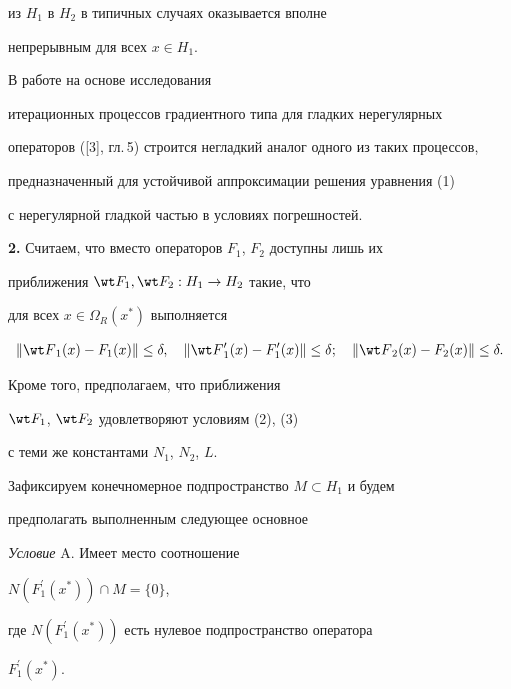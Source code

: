 из $H_1$ в $H_2$ в типичных случаях оказывается вполне


непрерывным для всех $x \in H_1$.


В работе на основе исследования


итерационных процессов градиентного типа для гладких нерегулярных


операторов ([3], гл.\,5) строится негладкий аналог одного из таких процессов,


предназначенный для устойчивой аппроксимации решения уравнения (1)


с нерегулярной гладкой частью в условиях погрешностей.


\medskip





{\bf 2.} Считаем, что вместо операторов $F_1$, $F_2$ доступны лишь их


приближения $\wt F_1, \wt F_2: H_1 \to H_2$ такие, что


для всех $x \in \Omega_R (x^*)$ выполняется


\begin{equation}


\Vert {\wt F}_1 (x)- F_1 (x) \Vert \leq \delta, \quad


\Vert {\wt F}{}_1^{\prime}(x)- F_1^{\prime}(x) \Vert \leq \delta;\quad


\Vert {\wt F}_2 (x)- F_2 (x) \Vert \leq \delta.


\end{equation}


Кроме того, предполагаем, что приближения


$\wt F_1$, $\wt F_2$ удовлетворяют условиям (2), (3)


с теми же константами $N_1$, $N_2$, $L$.





Зафиксируем конечномерное подпространство $M \subset H_1$ и будем


предполагать выполненным следующее основное


\medskip





{\it Условие} A. Имеет место соотношение


$N(F_1^{\prime}(x^*)) \cap M =\{ 0\}$,


где $N(F_1^{\prime}(x^*))$ есть нулевое подпространство оператора


$F_1^{\prime}(x^*)$.








